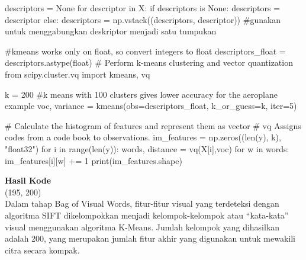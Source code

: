 \documentclass[
  letterpaper,
  DIV=11,
  numbers=noendperiod]{scrreprt}
\newenvironment{Shaded}{\begin{snugshade}}{\end{snugshade}}
\newcommand{\BuiltInTok}[1]{\textcolor[rgb]{0.00,0.23,0.31}{#1}}
\newcommand{\CommentTok}[1]{\textcolor[rgb]{0.37,0.37,0.37}{#1}}
\newcommand{\ControlFlowTok}[1]{\textcolor[rgb]{0.00,0.23,0.31}{#1}}
\newcommand{\DecValTok}[1]{\textcolor[rgb]{0.68,0.00,0.00}{#1}}
\newcommand{\ImportTok}[1]{\textcolor[rgb]{0.00,0.46,0.62}{#1}}
\newcommand{\KeywordTok}[1]{\textcolor[rgb]{0.00,0.23,0.31}{#1}}
\newcommand{\NormalTok}[1]{\textcolor[rgb]{0.00,0.23,0.31}{#1}}
\newcommand{\OperatorTok}[1]{\textcolor[rgb]{0.37,0.37,0.37}{#1}}
\newcommand{\StringTok}[1]{\textcolor[rgb]{0.13,0.47,0.30}{#1}}
\newcommand{\VariableTok}[1]{\textcolor[rgb]{0.07,0.07,0.07}{#1}}
\begin{document}
\begin{Shaded}
\begin{Highlighting}[]
\NormalTok{descriptors }\OperatorTok{=} \VariableTok{None}
\ControlFlowTok{for}\NormalTok{ descriptor }\KeywordTok{in}\NormalTok{ X:}
    \ControlFlowTok{if}\NormalTok{ descriptors }\KeywordTok{is} \VariableTok{None}\NormalTok{:}
\NormalTok{        descriptors }\OperatorTok{=}\NormalTok{ descriptor}
    \ControlFlowTok{else}\NormalTok{:}
\NormalTok{        descriptors }\OperatorTok{=}\NormalTok{ np.vstack((descriptors, descriptor)) }\CommentTok{\#gunakan untuk menggabungkan deskriptor menjadi satu tumpukan}

\CommentTok{\#kmeans works only on float, so convert integers to float}
\NormalTok{descriptors\_float }\OperatorTok{=}\NormalTok{ descriptors.astype(}\BuiltInTok{float}\NormalTok{)  }
\CommentTok{\# Perform k{-}means clustering and vector quantization}
\ImportTok{from}\NormalTok{ scipy.cluster.vq }\ImportTok{import}\NormalTok{ kmeans, vq}

\NormalTok{k }\OperatorTok{=} \DecValTok{200}  \CommentTok{\#k means with 100 clusters gives lower accuracy for the aeroplane example}
\NormalTok{voc, variance }\OperatorTok{=}\NormalTok{ kmeans(obs}\OperatorTok{=}\NormalTok{descriptors\_float, k\_or\_guess}\OperatorTok{=}\NormalTok{k, }\BuiltInTok{iter}\OperatorTok{=}\DecValTok{5}\NormalTok{) }

\CommentTok{\# Calculate the histogram of features and represent them as vector}
\CommentTok{\# vq Assigns codes from a code book to observations.}
\NormalTok{im\_features }\OperatorTok{=}\NormalTok{ np.zeros((}\BuiltInTok{len}\NormalTok{(y), k), }\StringTok{"float32"}\NormalTok{)}
\ControlFlowTok{for}\NormalTok{ i }\KeywordTok{in} \BuiltInTok{range}\NormalTok{(}\BuiltInTok{len}\NormalTok{(y)):}
\NormalTok{    words, distance }\OperatorTok{=}\NormalTok{ vq(X[i],voc)}
    \ControlFlowTok{for}\NormalTok{ w }\KeywordTok{in}\NormalTok{ words:}
\NormalTok{        im\_features[i][w] }\OperatorTok{+=} \DecValTok{1}
\BuiltInTok{print}\NormalTok{(im\_features.shape)}
\end{Highlighting}
\end{Shaded}

\textbf{Hasil Kode}\\
(195, 200)\\
Dalam tahap Bag of Visual Words, fitur-fitur visual yang terdeteksi
dengan algoritma SIFT dikelompokkan menjadi kelompok-kelompok atau
``kata-kata'' visual menggunakan algoritma K-Means. Jumlah kelompok yang
dihasilkan adalah 200, yang merupakan jumlah fitur akhir yang digunakan
untuk mewakili citra secara kompak.
\end{document}
